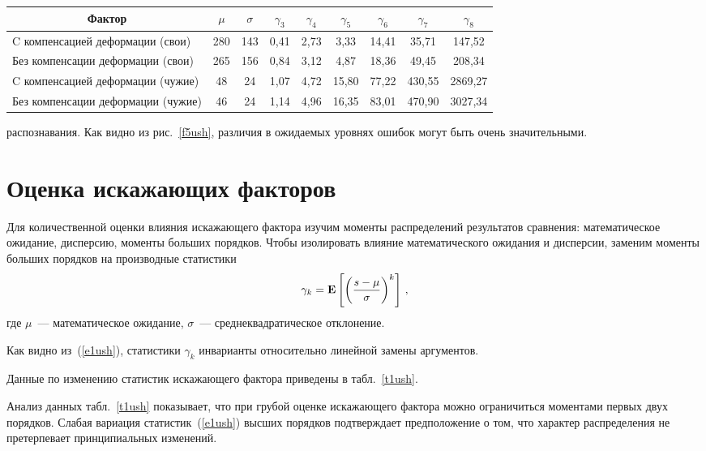 \begin{multicols}{2}
\begin{table*}[b]
\begin{center}
\begin{tabular}{|l|c|c|c|c|c|c|c|c|}
\hline
\multicolumn{1}{|c|}{Фактор}&$\mu$&$\sigma$&$\gamma_3$&$\gamma_4$&$\gamma_5$&$\gamma_6$&$\gamma_7$
&$\gamma_8$\\
\hline
C компенсацией деформации (свои)&280&143&0,41&2,73&3,33&14,41&35,71&147,52\\
Без компенсации деформации  
(свои)&265&156&0,84&3,12&4,87&18,36&49,45&208,34\\
C компенсацией деформации 
(чужие)&\hphantom{9}48&\hphantom{9}24&1,07&4,72&15,80\hphantom{9}&77,22&430,55\hphantom{9}&2869,27\hphantom{9}\\
Без компенсации деформации 
(чужие)&\hphantom{9}46&\hphantom{9}24&1,14&4,96&16,35\hphantom{9}&83,01&470,90\hphantom{9}&3027,34\hphantom{9}\\
\hline
\end{tabular}
\end{center}
\end{table*}
распознавания. Как видно из рис.~\ref{f5ush}, различия в ожидаемых уровнях ошибок 
могут быть очень значительными.
     
     
\vspace*{6pt}
\section{Оценка искажающих факторов}
\vspace*{3pt}

     Для количественной оценки влияния искажающего фактора изучим моменты 
распределений результатов сравнения: математическое ожидание, дисперсию, моменты 
больших порядков. Чтобы изолировать влияние математического ожидания и 
дисперсии, заменим моменты больших порядков на производные статистики
     \begin{equation}
     \gamma_k = \mathbf{E}\left [ \left ( \displaystyle\frac{\displaystyle s-\mu\mathstrut}{\displaystyle \sigma\mathstrut}\right )^k\right ]\,,
     \label{e1ush}
     \end{equation}
     где $\mu$~--- математическое ожидание, $\sigma$~--- сред\-не\-квад\-ра\-ти\-ческое 
отклонение.

     Как видно из~(\ref{e1ush}), статистики $\gamma_k$ инварианты относительно 
линейной замены аргументов.
     
     Данные по изменению статистик искажающего фактора приведены в 
табл.~\ref{t1ush}.


   
     Анализ данных табл.~\ref{t1ush} показывает, что при грубой оценке искажающего 
фактора можно ограничиться моментами первых двух порядков. Слабая вариация 
статистик~(\ref{e1ush}) высших порядков подтверждает предположение о том, что 
характер распределения не претерпевает принципиальных изменений. 
     

\end{multicols}
